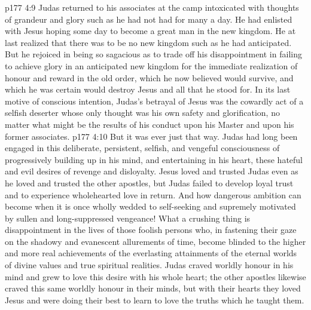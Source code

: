 \vs p177 4:9 Judas returned to his associates at the camp intoxicated with thoughts of grandeur and glory such as he had not had for many a day. He had enlisted with Jesus hoping some day to become a great man in the new kingdom. He at last realized that there was to be no new kingdom such as he had anticipated. But he rejoiced in being so sagacious as to trade off his disappointment in failing to achieve glory in an anticipated new kingdom for the immediate realization of honour and reward in the old order, which he now believed would survive, and which he was certain would destroy Jesus and all that he stood for. In its last motive of conscious intention, Judas’s betrayal of Jesus was the cowardly act of a selfish deserter whose only thought was his own safety and glorification, no matter what might be the results of his conduct upon his Master and upon his former associates.
\vs p177 4:10 But it was ever just that way. Judas had long been engaged in this deliberate, persistent, selfish, and vengeful consciousness of progressively building up in his mind, and entertaining in his heart, these hateful and evil desires of revenge and disloyalty. Jesus loved and trusted Judas even as he loved and trusted the other apostles, but Judas failed to develop loyal trust and to experience wholehearted love in return. And how dangerous ambition can become when it is once wholly wedded to self\hyp{}seeking and supremely motivated by sullen and long\hyp{}suppressed vengeance! What a crushing thing is disappointment in the lives of those foolish persons who, in fastening their gaze on the shadowy and evanescent allurements of time, become blinded to the higher and more real achievements of the everlasting attainments of the eternal worlds of divine values and true spiritual realities. Judas craved worldly honour in his mind and grew to love this desire with his whole heart; the other apostles likewise craved this same worldly honour in their minds, but with their hearts they loved Jesus and were doing their best to learn to love the truths which he taught them.
